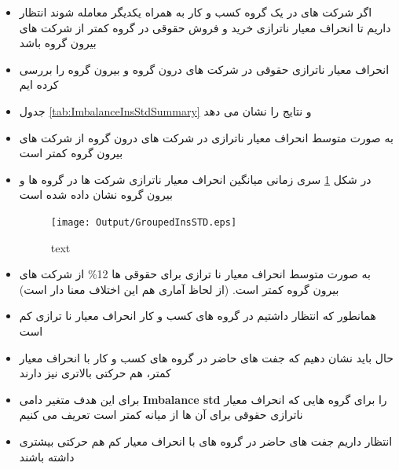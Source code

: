 \documentclass[12pt, a4paper]{article}
\begin{document}
 \begin{itemize}
 	\item 
 	اگر شرکت های در یک گروه کسب و کار به همراه یکدیگر معامله شوند انتظار داریم تا انحراف معیار ناترازی خرید و فروش  حقوقی در گروه کمتر از شرکت های بیرون گروه باشد
 	\item 
 	انحراف معیار ناترازی حقوقی در شرکت های درون گروه و بیرون گروه را بررسی کرده ایم
 		\item 
 	جدول 
 		\ref{tab:ImbalanceInsStdSummary}
 	و
 	نتایج را نشان می دهد
 	\begin{LTR}
 	\end{LTR}

 		\item 
 	به صورت متوسط انحراف معیار ناترازی در شرکت های درون گروه از شرکت های بیرون گروه کمتر است	
 	
 	\item 
 	در شکل 
 	\ref{fig:GroupedInsSTD}
 	سری زمانی میانگین انحراف معیار ناترازی شرکت ها در گروه ها و بیرون گروه نشان داده شده است
 	\begin{figure}[htbp]
 		\centering
 		\caption{text}
 		\texttt{[image: Output/GroupedInsSTD.eps]}
 		\label{fig:GroupedInsSTD}
 	\end{figure}

 	\item 
 	به صورت متوسط انحراف معیار نا ترازی برای حقوقی ها 12\%
 	از شرکت های بیرون گروه کمتر است. (از لحاظ آماری هم این اختلاف معنا دار است)
 	
 \end{itemize}
  

\begin{itemize}
	\item 
	همانطور که انتظار داشتیم در گروه های کسب و کار انحراف معیار نا ترازی کم است
	\item 
	حال باید نشان دهیم که جفت های حاضر  در گروه های کسب و کار با انحراف معیار کمتر، هم حرکتی بالاتری نیز دارند
	\item 
	برای این هدف متغیر دامی 
	\textbf{Imbalance std}
	را برای گروه هایی که انحراف معیار ناترازی حقوقی برای آن ها از میانه کمتر است تعریف می کنیم
%	
	\item 
	انتظار داریم جفت های حاضر در گروه های با انحراف معیار کم هم حرکتی بیشتری داشته باشند
	
\end{itemize}
\end{document}
